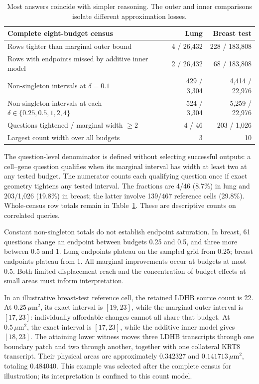 \documentclass[10pt,letterpaper]{article}
\begin{document}
\begin{table}[t]\centering
\begin{tabular}{lrr}\toprule
Complete eight-budget census & Lung & Breast test\\\midrule
Rows tighter than marginal outer bound &4 / 26,432&228 / 183,808\\
Rows with endpoints missed by additive inner model &2 / 26,432&68 / 183,808\\
Non-singleton intervals at $\delta=0.1$ &429 / 3,304&4,414 / 22,976\\
Non-singleton intervals at each $\delta\in\{0.25,0.5,1,2,4\}$ &524 / 3,304&5,259 / 22,976\\
Questions tightened / marginal width $\ge2$ &4 / 46&203 / 1,026\\
Largest count width over all budgets &3&10\\\bottomrule
\end{tabular}
\caption{Most answers coincide with simpler reasoning. The outer and inner comparisons isolate different approximation losses.}\label{tab:counts}
\end{table}

The question-level denominator is defined without selecting successful outputs: a cell--gene question qualifies when its marginal interval has width at least two at any tested budget. The numerator counts each qualifying question once if exact geometry tightens any tested interval. The fractions are 4/46 (8.7\%) in lung and 203/1,026 (19.8\%) in breast; the latter involve 139/467 reference cells (29.8\%). Whole-census row totals remain in Table~\ref{tab:counts}. These are descriptive counts on correlated queries.

Constant non-singleton totals do not establish endpoint saturation. In breast, 61 questions change an endpoint between budgets 0.25 and 0.5, and three more between 0.5 and 1. Lung endpoints plateau on the sampled grid from 0.25; breast endpoints plateau from 1. All marginal improvements occur at budgets at most 0.5. Both limited displacement reach and the concentration of budget effects at small areas must inform interpretation.

In an illustrative breast-test reference cell, the retained LDHB source count is 22. At $0.25\,\mu\mathrm m^2$, its exact interval is $[19,23]$, while the marginal outer interval is $[17,23]$: individually affordable changes cannot all share that budget. At $0.5\,\mu\mathrm m^2$, the exact interval is $[17,23]$, while the additive inner model gives $[18,23]$. The attaining lower witness moves three LDHB transcripts through one boundary patch and two through another, together with one collateral KRT8 transcript. Their physical areas are approximately $0.342327$ and $0.141713\,\mu\mathrm m^2$, totaling $0.484040$. This example was selected after the complete census for illustration; its interpretation is confined to this count model.
\end{document}
